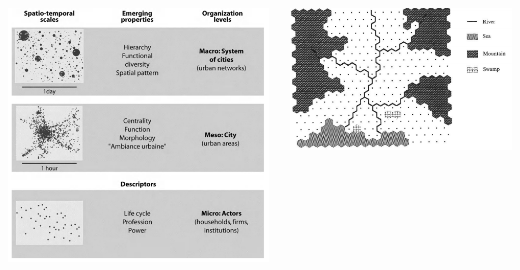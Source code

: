 {\medskip

\begin{center}
	\begin{columns}
	\begin{column}{0.45\linewidth}
	\includegraphics[width=\textwidth]{figures/evoltheory_scales.png}
	\end{column}
	\begin{column}{0.22\linewidth}
	\includegraphics[width=\textwidth]{figures/simpop1.png}\\\medskip

\end{column}
\end{columns}
\end{center}}
